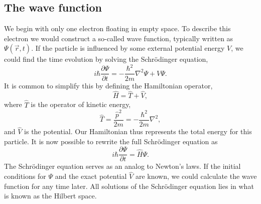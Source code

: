 \subsection{The wave function}
We begin with only one electron floating in empty space.
To describe this electron we would construct a so-called wave function,
typically written as $\Psi(\vec{r},t)$.
If the particle is influenced by some external potential energy $V$, we could find
the time evolution by solving the Schrödinger equation,
\begin{equation}
\label{eq:qm:schrodinger}
i\hbar \frac{\partial \Psi}{\partial t} = - \frac{\hbar^2}{2m}
\nabla^2 \Psi+ V \Psi .
\end{equation}
It is common to simplify this by defining the Hamiltonian operator,
\begin{equation}
\hat{H} = \hat{T} + \hat{V},
\end{equation}
where $\hat{T}$ is the operator of kinetic energy,
\begin{equation}
\hat{T} = \frac{\hat{p}^2}{2m} = - \frac{\hbar^2}{2m} \nabla^2,
\end{equation}
and $\hat{V}$ is the potential. 
Our Hamiltonian thus represents the total energy for this particle.
It is now possible to rewrite the full Schrödinger equation as
\begin{equation}
\label{eq:qm:schrodingersimple}
i\hbar \frac{\partial \Psi}{\partial t} = \hat{H} \Psi .
\end{equation}
The Schrödinger equation serves as an analog to Newton's laws.
If the initial conditions for $\Psi$ and the exact potential $\hat{V}$ are known, 
we could calculate the wave function for any time later.
All solutions of the Schrödinger equation lies in what is known as the Hilbert
space.


